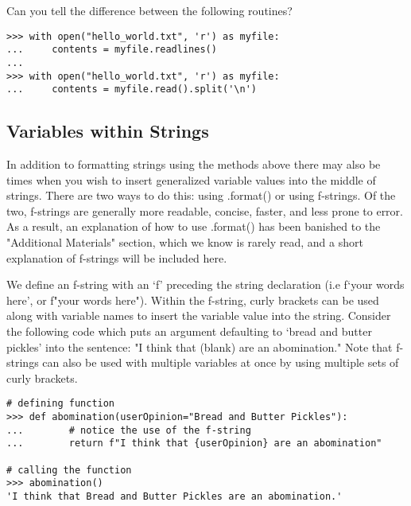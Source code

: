 Can you tell the difference between the following routines?

\begin{lstlisting}
>>> with open("hello_world.txt", 'r') as myfile:
...     contents = myfile.readlines()
...
>>> with open("hello_world.txt", 'r') as myfile:
...     contents = myfile.read().split('\n')
\end{lstlisting}

\subsection*{Variables within Strings}%

In addition to formatting strings using the methods above there may also be times when you wish to insert generalized variable values into the middle of strings. There are two ways to do this: using .format() or using f-strings. Of the two, f-strings are generally more readable, concise, faster, and less prone to error. As a result, an explanation of how to use .format() has been banished to the "Additional Materials" section, which we know is rarely read, and a short explanation of f-strings will be included here.

We define an f-string with an `f' preceding the string declaration (i.e f`your words here', or f"your words here"). Within the f-string, curly brackets can be used along with variable names to insert the variable value into the string. Consider the following code which puts an argument defaulting to `bread and butter pickles' into the sentence: "I think that (blank) are an abomination." Note that f-strings can also be used with multiple variables at once by using multiple sets of curly brackets.

\begin{lstlisting}
# defining function
>>> def abomination(userOpinion="Bread and Butter Pickles"):
...        # notice the use of the f-string
...        return f"I think that {userOpinion} are an abomination"

# calling the function
>>> abomination()
'I think that Bread and Butter Pickles are an abomination.'

\end{lstlisting}

